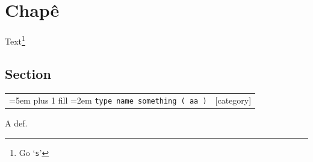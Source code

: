 \documentclass{book}
\newcommand{\Texinfothechapterheading}{}
\newcommand{\Texinfoheadingchaptername}{\chaptername}
\newcommand{\Texinfochapter}[1]{\chapter{#1}
\renewcommand{\Texinfothechapterheading}{\Texinfoheadingchaptername{} \thechapter{} }%
}%
\newenvironment{Texinfoindented}{\begin{list}{}{}\item\relax}{\end{list}}
\renewcommand{\_}{\Texinfounderscore\discretionary{}{}{}}
\begin{document}
\tableofcontents\newpage
\label{anchor:Top}%
\Texinfochapter{{Chap\^{e}}}
\label{anchor:chap_00ea}%

Text\footnote{Go `\texttt{s}'}

%

\section{{Section}}
\label{anchor:sec}%

\printindex[cp]


\smallbreak
\noindent\begin{tabularx}{\linewidth}{@{}Xr}
\rightskip=5em plus 1 fill \hangindent=2em \hyphenpenalty=10000
\texttt{type name something\ (\ aa\ )}& [category]
\end{tabularx}

%
\begin{Texinfoindented}
\unskip{\parskip=0pt\noindent}%
A def.
\end{Texinfoindented}
\end{document}
